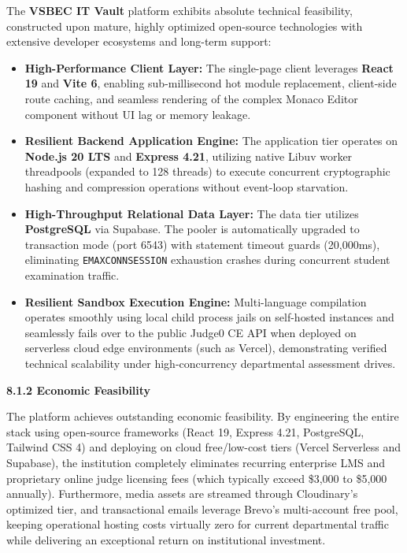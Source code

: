 {\fontsize{12pt}{17.5pt}\selectfont
The \textbf{VSBEC IT Vault} platform exhibits absolute technical feasibility, constructed upon mature, highly optimized open-source technologies with extensive developer ecosystems and long-term support:
\begin{itemize}[noitemsep,topsep=2pt,leftmargin=*]
  \item \textbf{High-Performance Client Layer:} The single-page client leverages \textbf{React 19} and \textbf{Vite 6}, enabling sub-millisecond hot module replacement, client-side route caching, and seamless rendering of the complex Monaco Editor component without UI lag or memory leakage.
  \item \textbf{Resilient Backend Application Engine:} The application tier operates on \textbf{Node.js 20 LTS} and \textbf{Express 4.21}, utilizing native Libuv worker threadpools (expanded to 128 threads) to execute concurrent cryptographic hashing and compression operations without event-loop starvation.
  \item \textbf{High-Throughput Relational Data Layer:} The data tier utilizes \textbf{PostgreSQL} via Supabase. The pooler is automatically upgraded to transaction mode (port 6543) with statement timeout guards (20,000ms), eliminating \texttt{EMAXCONNSESSION} exhaustion crashes during concurrent student examination traffic.
  \item \textbf{Resilient Sandbox Execution Engine:} Multi-language compilation operates smoothly using local child process jails on self-hosted instances and seamlessly fails over to the public Judge0 CE API when deployed on serverless cloud edge environments (such as Vercel), demonstrating verified technical scalability under high-concurrency departmental assessment drives.
\end{itemize}

\vspace{0.4cm}
{\fontsize{13pt}{17pt}\selectfont\bfseries 8.1.2 Economic Feasibility\par}
\vspace{0.2cm}

The platform achieves outstanding economic feasibility. By engineering the entire stack using open-source frameworks (React 19, Express 4.21, PostgreSQL, Tailwind CSS 4) and deploying on cloud free/low-cost tiers (Vercel Serverless and Supabase), the institution completely eliminates recurring enterprise LMS and proprietary online judge licensing fees (which typically exceed \$3,000 to \$5,000 annually). Furthermore, media assets are streamed through Cloudinary's optimized tier, and transactional emails leverage Brevo's multi-account free pool, keeping operational hosting costs virtually zero for current departmental traffic while delivering an exceptional return on institutional investment.

}
